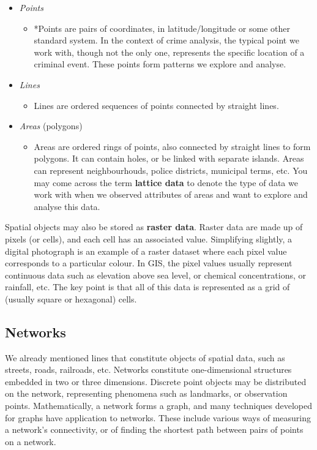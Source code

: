 \documentclass[
]{book}
\providecommand{\tightlist}{%
  \setlength{\itemsep}{0pt}\setlength{\parskip}{0pt}}
\begin{document}
\begin{itemize}
\tightlist
\item
  \emph{Points}

  \begin{itemize}
  \tightlist
  \item
    *Points are pairs of coordinates, in latitude/longitude or some other standard system. In the context of crime analysis, the typical point we work with, though not the only one, represents the specific location of a criminal event. These points form patterns we explore and analyse.
  \end{itemize}
\item
  \emph{Lines}

  \begin{itemize}
  \tightlist
  \item
    Lines are ordered sequences of points connected by straight lines.
  \end{itemize}
\item
  \emph{Areas} (polygons)

  \begin{itemize}
  \tightlist
  \item
    Areas are ordered rings of points, also connected by straight lines to form polygons. It can contain holes, or be linked with separate islands. Areas can represent neighbourhouds, police districts, municipal terms, etc. You may come across the term \textbf{lattice data} to denote the type of data we work with when we observed attributes of areas and want to explore and analyse this data.
  \end{itemize}
\end{itemize}

Spatial objects may also be stored as \textbf{raster data}. Raster data are made up of pixels (or cells), and each cell has an associated value. Simplifying slightly, a digital photograph is an example of a raster dataset where each pixel value corresponds to a particular colour. In GIS, the pixel values usually represent continuous data such as elevation above sea level, or chemical concentrations, or rainfall, etc. The key point is that all of this data is represented as a grid of (usually square or hexagonal) cells.

\hypertarget{networks}{%
\subsection{Networks}\label{networks}}

We already mentioned lines that constitute objects of spatial data, such as streets, roads, railroads, etc. Networks constitute one-dimensional structures embedded in two or three dimensions. Discrete point objects may be distributed on the network, representing phenomena such as landmarks, or observation points. Mathematically, a network forms a graph, and many techniques developed for graphs have application to networks. These include various ways of measuring a network's connectivity, or of finding the shortest path between pairs of points on a network.
\end{document}
